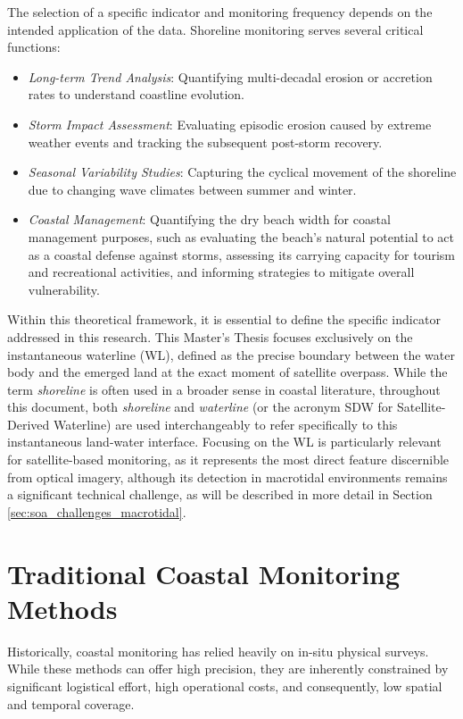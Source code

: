 ﻿\documentclass[ENG]{TFUOC}%
\begin{document}
The selection of a specific indicator and monitoring frequency depends on the intended application of the data. Shoreline monitoring serves several critical functions:
\begin{itemize}
    \item \textit{Long-term Trend Analysis}: Quantifying multi-decadal erosion or accretion rates to understand coastline evolution.
    \item \textit{Storm Impact Assessment}: Evaluating episodic erosion caused by extreme weather events and tracking the subsequent post-storm recovery.
    \item \textit{Seasonal Variability Studies}: Capturing the cyclical movement of the shoreline due to changing wave climates between summer and winter.
    \item \textit{Coastal Management}: Quantifying the dry beach width for coastal management purposes, such as evaluating the beach's natural potential to act as a coastal defense against storms, assessing its carrying capacity for tourism and recreational activities, and informing strategies to mitigate overall vulnerability.
\end{itemize}

Within this theoretical framework, it is essential to define the specific indicator addressed in this research. This Master's Thesis focuses exclusively on the instantaneous waterline (WL), defined as the precise boundary between the water body and the emerged land at the exact moment of satellite overpass. While the term \textit{shoreline} is often used in a broader sense in coastal literature, throughout this document, both \textit{shoreline} and \textit{waterline} (or the acronym SDW for Satellite-Derived Waterline) are used interchangeably to refer specifically to this instantaneous land-water interface. Focusing on the WL is particularly relevant for satellite-based monitoring, as it represents the most direct feature discernible from optical imagery, although its detection in macrotidal environments remains a significant technical challenge, as will be described in more detail in Section \ref{sec:soa_challenges_macrotidal}.

\section{Traditional Coastal Monitoring Methods}

Historically, coastal monitoring has relied heavily on in-situ physical surveys. While these methods can offer high precision, they are inherently constrained by significant logistical effort, high operational costs, and consequently, low spatial and temporal coverage. 
\end{document}
